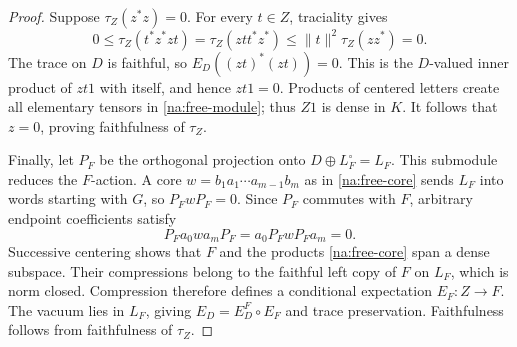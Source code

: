 \begin{proof}
Suppose $\tau_Z(z^*z)=0$.  For every $t\in Z$, traciality gives
\[
 0\leq\tau_Z(t^*z^*zt)
 =\tau_Z(ztt^*z^*)
 \leq\|t\|^2\tau_Z(zz^*)=0.
\]
The trace on $D$ is faithful, so $E_D((zt)^*(zt))=0$.  This is the
$D$-valued inner product of $zt1$ with itself, and hence $zt1=0$.  Products of
centered letters create all elementary tensors in
\eqref{na:free-module}; thus $Z1$ is dense in $K$.  It follows that
$z=0$, proving faithfulness of $\tau_Z$.

Finally, let $P_F$ be the orthogonal projection onto
$D\oplus L_F^\circ=L_F$.  This submodule reduces the $F$-action.
A core $w=b_1a_1\cdots a_{m-1}b_m$ as in
\eqref{na:free-core} sends $L_F$ into words starting with $G$, so
$P_FwP_F=0$.  Since $P_F$ commutes with $F$, arbitrary endpoint
coefficients satisfy
\[
 P_Fa_0wa_mP_F=a_0P_FwP_Fa_m=0.
\]
Successive centering shows that $F$ and the products
\eqref{na:free-core} span a dense subspace.  Their compressions belong
to the faithful left copy of $F$ on $L_F$, which is norm closed.
Compression therefore defines a conditional expectation $E_F:Z\to F$.
The vacuum lies in $L_F$, giving $E_D=E_D^F\circ E_F$ and trace
preservation.  Faithfulness follows from faithfulness of $\tau_Z$.
\end{proof}

